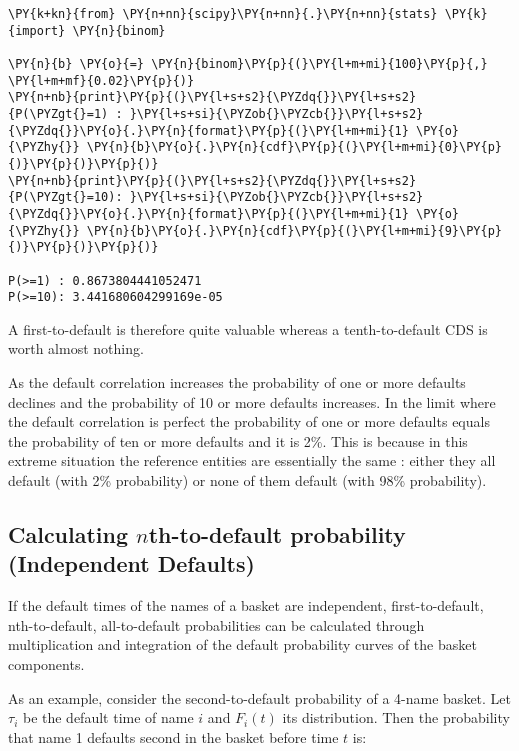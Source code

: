 \begin{tcolorbox}[breakable, size=fbox, boxrule=1pt, pad at break*=1mm,colback=cellbackground, colframe=cellborder]
\begin{Verbatim}[commandchars=\\\{\}]
\PY{k+kn}{from} \PY{n+nn}{scipy}\PY{n+nn}{.}\PY{n+nn}{stats} \PY{k}{import} \PY{n}{binom}
	
\PY{n}{b} \PY{o}{=} \PY{n}{binom}\PY{p}{(}\PY{l+m+mi}{100}\PY{p}{,} \PY{l+m+mf}{0.02}\PY{p}{)}
\PY{n+nb}{print}\PY{p}{(}\PY{l+s+s2}{\PYZdq{}}\PY{l+s+s2}{P(\PYZgt{}=1) : }\PY{l+s+si}{\PYZob{}\PYZcb{}}\PY{l+s+s2}{\PYZdq{}}\PY{o}{.}\PY{n}{format}\PY{p}{(}\PY{l+m+mi}{1} \PY{o}{\PYZhy{}} \PY{n}{b}\PY{o}{.}\PY{n}{cdf}\PY{p}{(}\PY{l+m+mi}{0}\PY{p}{)}\PY{p}{)}\PY{p}{)}
\PY{n+nb}{print}\PY{p}{(}\PY{l+s+s2}{\PYZdq{}}\PY{l+s+s2}{P(\PYZgt{}=10): }\PY{l+s+si}{\PYZob{}\PYZcb{}}\PY{l+s+s2}{\PYZdq{}}\PY{o}{.}\PY{n}{format}\PY{p}{(}\PY{l+m+mi}{1} \PY{o}{\PYZhy{}} \PY{n}{b}\PY{o}{.}\PY{n}{cdf}\PY{p}{(}\PY{l+m+mi}{9}\PY{p}{)}\PY{p}{)}\PY{p}{)}
	
P(>=1) : 0.8673804441052471
P(>=10): 3.441680604299169e-05
\end{Verbatim}
\end{tcolorbox}

A first-to-default is therefore quite valuable whereas a tenth-to-default CDS is worth almost nothing.

As the default correlation increases the probability of one or more defaults declines and the probability of 10 or more defaults increases. In the limit where the default correlation is perfect the probability of one or more defaults equals the probability of ten or more defaults and it is 2\%. This is because in this extreme situation the reference entities are essentially the same : either they all default (with 2\% probability) or none of them default (with 98\% probability).

\subsection{Calculating $n$th-to-default probability (Independent Defaults)}\label{independent-defaults}

If the default times of the names of a basket are independent,
first-to-default, nth-to-default, all-to-default probabilities can be
calculated through multiplication and integration of the default
probability curves of the basket components.

As an example, consider the second-to-default probability of a 4-name
basket. Let \(\tau_i\) be the default time of name \(i\) and \(F_i(t)\)
its distribution. Then the probability that name 1 defaults second in
the basket before time \(t\) is:

